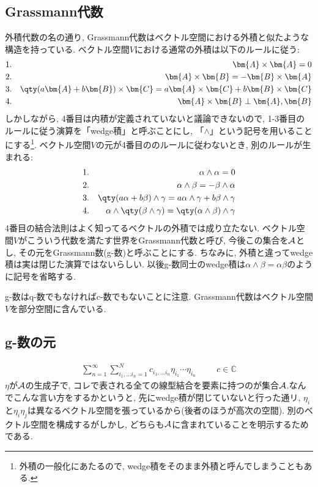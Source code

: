 \documentclass[10.5pt,a4paper]{jreport}
\begin{document}
\subsection{Grassmann代数}
外積代数の名の通り, Grassmann代数はベクトル空間における外積と似たような構造を持っている. ベクトル空間$V$における通常の外積は以下のルールに従う:
\begin{eqnarray}
  1.&& \bm{A}\times\bm{A} = 0\\
  2.&& \bm{A}\times\bm{B} = -\bm{B}\times\bm{A}\\
  3.&& \qty(a\bm{A} + b\bm{B})\times\bm{C} = a\bm{A}\times\bm{C} + b\bm{B}\times\bm{C}\\
  4.&& \bm{A}\times\bm{B} \perp \bm{A}, \bm{B}
\end{eqnarray}
しかしながら, 4番目は内積が定義されていないと議論できないので, 1-3番目のルールに従う演算を「wedge積」と呼ぶことにし, 「$\wedge$」という記号を用いることにする\footnote{外積の一般化にあたるので, wedge積をそのまま外積と呼んでしまうこともある. }. ベクトル空間$V$の元が4番目ののルールに従わないとき, 別のルールが生まれる:
\begin{eqnarray}
  1.&& \alpha\wedge \alpha = 0\\
  2.&& \alpha\wedge\beta = -\beta\wedge\alpha\\
  3.&& \qty(a\alpha + b\beta)\wedge\gamma = a\alpha\wedge\gamma + b\beta\wedge\gamma\\
  4.&& \alpha\wedge\qty(\beta\wedge\gamma) = \qty(\alpha\wedge\beta)\wedge\gamma
\end{eqnarray}
4番目の結合法則はよく知ってるベクトルの外積では成り立たない. ベクトル空間$V$がこういう代数を満たす世界をGrassmann代数と呼び, 今後この集合を${\cal A}$とし, その元をGrassmann数(g-数)と呼ぶことにする. ちなみに, 外積と違ってwedge積は実は閉じた演算ではないらしい. 以後g-数同士のwedge積は$\alpha\wedge\beta = \alpha\beta$のように記号を省略する.

g-数はq-数でもなければc-数でもないことに注意. Grassmann代数はベクトル空間$V$を部分空間に含んでいる. 
\subsection{g-数の元}
\begin{eqnarray}
  \sum_{n=1}^{\infty}\sum_{i_1, ...i_n=1}^{N}c_{i_1, ...i_n}\eta_{i_1}\cdots\eta_{i_n}\hspace{1cm}c\in\mathbb{C}
\end{eqnarray}
$\eta$が${\cal A}$の生成子で, コレで表される全ての線型結合を要素に持つのが集合${\cal A}$.なんでこんな言い方をするかというと, 先にwedge積が閉じていないと行った通リ, $\eta_i$と$\eta_i\eta_j$は異なるベクトル空間を張っているから(後者のほうが高次の空間). 別のベクトル空間を構成するがしかし, どちらも${\cal A}$に含まれていることを明示するためである. 
\end{document}
